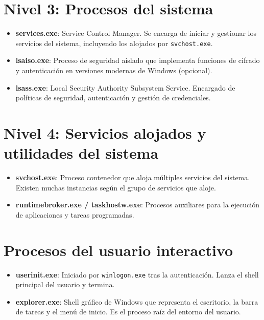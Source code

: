 \section*{Nivel 3: Procesos del sistema}

\begin{itemize}
    \item \textbf{services.exe}: Service Control Manager. Se encarga de iniciar
    y gestionar los servicios del sistema, incluyendo los alojados por
    \texttt{svchost.exe}.
    \item \textbf{lsaiso.exe}: Proceso de seguridad aislado que implementa
    funciones de cifrado y autenticación en versiones modernas de Windows
    (opcional).
    \item \textbf{lsass.exe}: Local Security Authority Subsystem Service.
    Encargado de políticas de seguridad, autenticación y gestión de
    credenciales.
\end{itemize}

\section*{Nivel 4: Servicios alojados y utilidades del sistema}

\begin{itemize}
    \item \textbf{svchost.exe}: Proceso contenedor que aloja múltiples servicios
    del sistema. Existen muchas instancias según el grupo de servicios que
    aloje.
    \item \textbf{runtimebroker.exe / taskhostw.exe}: Procesos auxiliares para
    la ejecución de aplicaciones y tareas programadas.
\end{itemize}

\section*{Procesos del usuario interactivo}

\begin{itemize}
    \item \textbf{userinit.exe}: Iniciado por \texttt{winlogon.exe} tras la
    autenticación. Lanza el shell principal del usuario y termina.
    \item \textbf{explorer.exe}: Shell gráfico de Windows que representa el
    escritorio, la barra de tareas y el menú de inicio. Es el proceso raíz del
    entorno del usuario.
\end{itemize}

